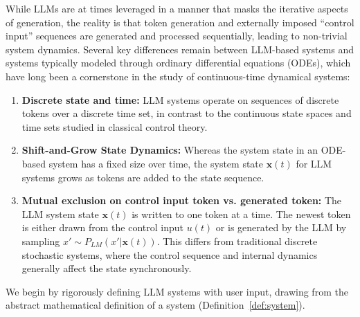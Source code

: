 \documentclass{article} %
\begin{document}
While LLMs are at times leveraged in a manner that masks the iterative aspects of generation, the reality is that token generation and externally imposed ``control input'' sequences are generated and processed sequentially, leading to non-trivial system dynamics. 
Several key differences remain between LLM-based systems and systems typically modeled through ordinary differential equations (ODEs), which have long been a cornerstone in the study of continuous-time dynamical systems:
\begin{enumerate}
    \item \textbf{Discrete state and time: } LLM systems operate on sequences of discrete tokens over a discrete time set, in contrast to the continuous state spaces and time sets studied in classical control theory.
    \item \textbf{Shift-and-Grow State Dynamics: } Whereas the system state in an ODE-based system has a fixed size over time, the system state $\mathbf x(t)$ for LLM systems grows as tokens are added to the state sequence. 
    \item \textbf{Mutual exclusion on control input token vs. generated token: } The LLM system state $\mathbf x(t)$ is written to one token at a time. 
    The newest token is either drawn from the control input $u(t)$ or is generated by the LLM by sampling $x'\sim P_{LM}(x' | \mathbf x(t))$. 
    This differs from traditional discrete stochastic systems, where the control sequence and internal dynamics generally affect the state synchronously. 
\end{enumerate}

We begin by rigorously defining LLM systems with user input, drawing from the abstract mathematical definition of a system (Definition~\ref{def:system}).
\end{document}
